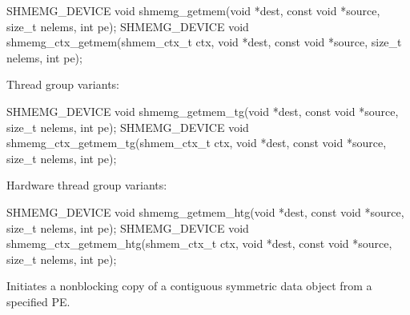 \begin{apidefinition}
\begin{Csynopsis}
SHMEMG_DEVICE void shmemg_getmem(void *dest, const void *source,
    size_t nelems, int pe);
SHMEMG_DEVICE void shmemg_ctx_getmem(shmem_ctx_t ctx, void *dest,
    const void *source, size_t nelems, int pe);
\end{Csynopsis}

Thread group variants:
\begin{CsynopsisCol}
SHMEMG_DEVICE void shmemg_getmem_tg(void *dest, const void *source,
    size_t nelems, int pe);
SHMEMG_DEVICE void shmemg_ctx_getmem_tg(shmem_ctx_t ctx, void *dest,
    const void *source, size_t nelems, int pe);
\end{CsynopsisCol}

Hardware thread group variants:
\begin{CsynopsisCol}
SHMEMG_DEVICE void shmemg_getmem_htg(void *dest, const void *source,
    size_t nelems, int pe);
SHMEMG_DEVICE void shmemg_ctx_getmem_htg(shmem_ctx_t ctx, void *dest,
    const void *source, size_t nelems, int pe);
\end{CsynopsisCol}

\begin{apiarguments}
\end{apiarguments}


\end{apidefinition}

\label{subsec:gc_get_nbi}

Initiates a nonblocking copy of a contiguous symmetric data object from a
specified \ac{PE}.

